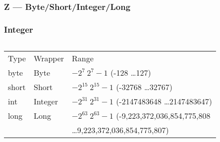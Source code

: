 \documentclass[en, 11pt, xcolor=dvipsnames]{beamer}
\begin{document}
\subsubsection{Z --- Byte/Short/Integer/Long}
\begin{frame}[fragile]
	\frametitle{Integer}


	\begin{columns}[c]
		\begin{column}{0.9\textwidth}

			\begin{table}
				\begin{tabular}{l l l}
					Type  & Wrapper & Range                                                   \\
					byte  & Byte    & $ -2^{7} ~ 2^{7} - 1 $ (-128 \dots 127)                 \\
					short & Short   & $ -2^{15} ~ 2^{15} - 1 $ (-32768 \dots 32767)           \\
					int   & Integer & $ -2^{31} ~ 2^{31} - 1 $ (-2147483648 \dots 2147483647) \\
					long  & Long    & $ -2^{63} ~ 2^{63} - 1 $ (-9,223,372,036,854,775,808    \\
					      &         & \dots 9,223,372,036,854,775,807)                        \\
				\end{tabular}
			\end{table}


\end{column}
\end{columns}
\end{frame}
\end{document}
